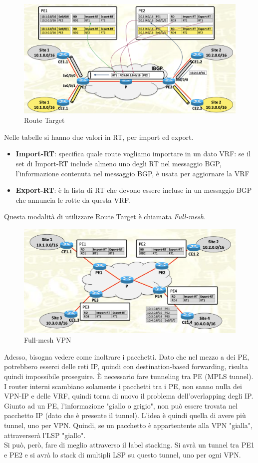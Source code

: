 \documentclass{article}
\begin{document}
\begin{figure}[H]
    \centering
    \includegraphics[scale=0.5]{figures/route target.png}
    \caption{Route Target}
\end{figure}
Nelle tabelle si hanno due valori in RT, per import ed export.
\begin{itemize}
    \item \textbf{Import-RT}: specifica quale route vogliamo importare in un dato VRF: se il set di Import-RT include almeno uno degli RT nel messaggio BGP, l'informazione contenuta nel messaggio BGP, è usata per aggiornare la VRF
    \item \textbf{Export-RT}: è la lista di RT che devono essere incluse in un messaggio BGP che annuncia le rotte da questa VRF.
\end{itemize}
Questa modalità di utilizzare Route Target è chiamata \textit{Full-mesh}.
\begin{figure}[H]
    \centering
    \includegraphics[scale=0.5]{figures/full-mesh vpn.png}
    \caption{Full-mesh VPN}
\end{figure}
Adesso, bisogna vedere come inoltrare i pacchetti. Dato che nel mezzo a dei PE, potrebbero esserci delle reti IP, quindi con destination-based forwarding, risulta quindi impossibile proseguire. È necessario fare tunneling tra PE (MPLS tunnel). I router interni scambiano solamente i pacchetti tra i PE, non sanno nulla dei VPN-IP e delle VRF, quindi torna di nuovo il problema dell'overlapping degli IP. Giunto ad un PE, l'informazione "giallo o grigio", non può essere trovata nel pacchetto IP (dato che è presente il tunnel). L'idea è quindi quella di avere più tunnel, uno per VPN. Quindi, se un pacchetto è appartentente alla VPN "gialla", attraverserà l'LSP "giallo". \\ Si può, però, fare di meglio attraverso il label stacking. Si avrà un tunnel tra PE1 e PE2 e si avrà lo stack di multipli LSP su questo tunnel, uno per ogni VPN. 
\end{document}
